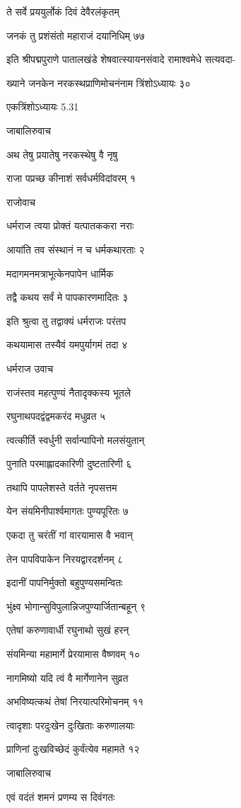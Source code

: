 ते सर्वे प्रययुर्लोकं दिवं देवैरलंकृतम्

जनकं तु प्रशंसंतो महाराजं दयानिधिम् ७७

इति श्रीपद्मपुराणे पातालखंडे शेषवात्स्यायनसंवादे रामाश्वमेधे सत्यवदा-

ख्याने जनकेन नरकस्थप्राणिमोचनंनाम त्रिंशोऽध्यायः ३०

एकत्रिंशोऽध्यायः 5.31

जाबालिरुवाच

अथ तेषु प्रयातेषु नरकस्थेषु वै नृषु

राजा पप्रच्छ कीनाशं सर्वधर्मविदांवरम् १

राजोवाच

धर्मराज त्वया प्रोक्तं यत्पातककरा नराः

आयांति तव संस्थानं न च धर्मकथारताः २

मदागमनमत्राभूत्केनपापेन धार्मिक

तद्वै कथय सर्वं मे पापकारणमादितः ३

इति श्रुत्वा तु तद्वाक्यं धर्मराजः परंतप

कथयामास तस्यैवं यमपुर्यागमं तदा ४

धर्मराज उवाच

राजंस्तव महत्पुण्यं नैतादृक्कस्य भूतले

रघुनाथपदद्वंद्वमकरंद मधुव्रत ५

त्वत्कीर्ति स्वर्धुनी सर्वान्पापिनो मलसंयुतान्

पुनाति परमाह्लादकारिणी दुष्टतारिणी ६

तथापि पापलेशस्ते वर्तते नृपसत्तम

येन संयमिनीपार्श्वमागतः पुण्यपूरितः ७

एकदा तु चरंतीं गां वारयामास वै भवान्

तेन पापविपाकेन निरयद्वारदर्शनम् ८

इदानीं पापनिर्मुक्तो बहुपुण्यसमन्वितः

भुंक्ष्व भोगान्सुविपुलान्निजपुण्यार्जितान्बहून् ९

एतेषां करुणावार्धी रघुनाथो सुखं हरन्

संयमिन्या महामार्गे प्रेरयामास वैष्णवम् १०

नागमिष्यो यदि त्वं वै मार्गेणानेन सुव्रत

अभविष्यत्कथं तेषां निरयात्परिमोचनम् ११

त्वादृशाः परदुःखेन दुःखिताः करुणालयाः

प्राणिनां दुःखविच्छेदं कुर्वंत्येव महामते १२

जाबालिरुवाच

एवं वदंतं शमनं प्रणम्य स दिवंगतः

